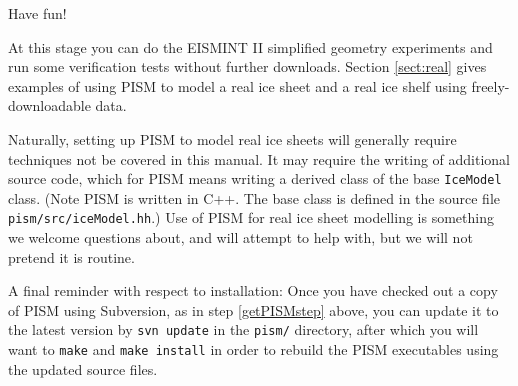 \documentclass[11pt,final]{amsart}
\begin{document}
Have fun!

At this stage you can do the EISMINT II simplified geometry experiments and run some verification tests without further downloads.  Section \ref{sect:real} gives examples of using PISM to model a real ice sheet and a real ice shelf using freely-downloadable data.

Naturally, setting up PISM to model real ice sheets will generally require techniques not be covered in this manual.  It may require the writing of additional source code, which for PISM means writing a derived class of the base \verb|IceModel| class.  (Note PISM is written in C++.  The base class is defined in the source file \verb|pism/src/iceModel.hh|.)  Use of PISM for real ice sheet modelling is something we welcome questions about, and will attempt to help with, but we will not pretend it is routine.

A final reminder with respect to installation:  Once you have checked out a copy of PISM using Subversion, as in step \ref{getPISMstep} above, you can update it to the latest version by \verb|svn update| in the \verb|pism/| directory, after which you will want to \verb|make| and \verb|make install| in order to rebuild the PISM executables using the updated source files.
\end{document}
